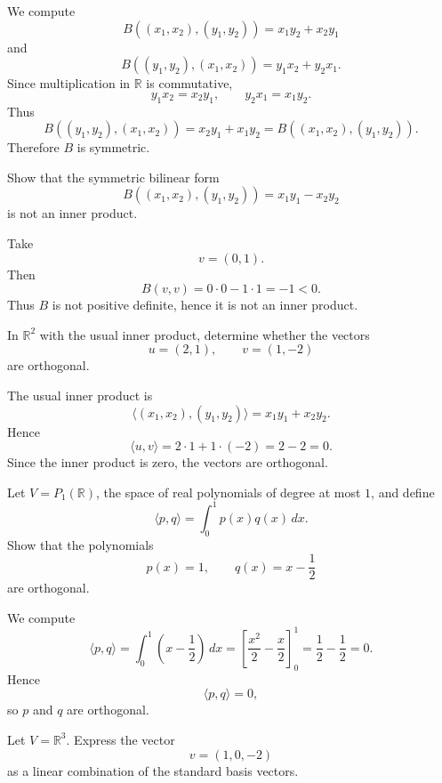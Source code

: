 \documentclass{article}
\begin{document}
	\begin{solution}
		We compute
		$$
		B((x_1,x_2),(y_1,y_2))=x_1y_2+x_2y_1
		$$
		and
		$$
		B((y_1,y_2),(x_1,x_2))=y_1x_2+y_2x_1.
		$$
		Since multiplication in $\mathbb{R}$ is commutative,
		$$
		y_1x_2=x_2y_1,\qquad y_2x_1=x_1y_2.
		$$
		Thus
		$$
		B((y_1,y_2),(x_1,x_2))=x_2y_1+x_1y_2=B((x_1,x_2),(y_1,y_2)).
		$$
		Therefore $B$ is symmetric.
	\end{solution}
	
	\begin{exercise}
		Show that the symmetric bilinear form
		$$
		B((x_1,x_2),(y_1,y_2))=x_1y_1-x_2y_2
		$$
		is not an inner product.
	\end{exercise}
	
	\begin{solution}
		Take
		$$
		v=(0,1).
		$$
		Then
		$$
		B(v,v)=0\cdot 0-1\cdot 1=-1<0.
		$$
		Thus $B$ is not positive definite, hence it is not an inner product.
	\end{solution}
	
	\begin{exercise}
		In $\mathbb{R}^2$ with the usual inner product, determine whether the vectors
		$$
		u=(2,1),\qquad v=(1,-2)
		$$
		are orthogonal.
	\end{exercise}
	
	\begin{solution}
		The usual inner product is
		$$
		\langle (x_1,x_2),(y_1,y_2)\rangle=x_1y_1+x_2y_2.
		$$
		Hence
		$$
		\langle u,v\rangle=2\cdot 1+1\cdot(-2)=2-2=0.
		$$
		Since the inner product is zero, the vectors are orthogonal.
	\end{solution}
	
	\begin{exercise}
		Let $V=P_1(\mathbb{R})$, the space of real polynomials of degree at most $1$, and define
		$$
		\langle p,q\rangle=\int_0^1 p(x)q(x)\,dx.
		$$
		Show that the polynomials
		$$
		p(x)=1,\qquad q(x)=x-\frac12
		$$
		are orthogonal.
	\end{exercise}
	
	\begin{solution}
		We compute
		$$
		\langle p,q\rangle=\int_0^1 \left(x-\frac12\right)\,dx
		=\left[\frac{x^2}{2}-\frac{x}{2}\right]_0^1
		=\frac12-\frac12=0.
		$$
		Hence
		$$
		\langle p,q\rangle=0,
		$$
		so $p$ and $q$ are orthogonal.
	\end{solution}
	
	\begin{exercise}
		Let $V=\mathbb{R}^3$. Express the vector
		$$
		v=(1,0,-2)
		$$
		as a linear combination of the standard basis vectors.
	\end{exercise}
	
\end{document}
